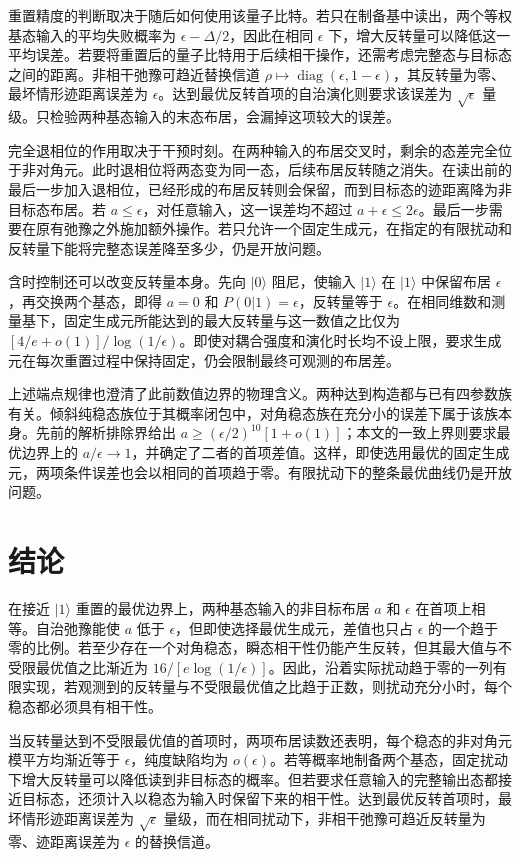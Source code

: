 \documentclass[aps,pra,reprint,amsmath,amssymb,nofootinbib,floatfix,longbibliography]{revtex4-2}
\theoremstyle{aps}
\DeclareMathOperator{\diag}{diag}
\newcommand{\eps}{\epsilon}
\newcommand{\ket}[1]{|#1\rangle}
\begin{document}
重置精度的判断取决于随后如何使用该量子比特。若只在制备基中读出，两个等权基态输入的平均失败概率为 $\eps-\Delta/2$，因此在相同 $\eps$ 下，增大反转量可以降低这一平均误差。若要将重置后的量子比特用于后续相干操作，还需考虑完整态与目标态之间的距离。非相干弛豫可趋近替换信道 $\rho\mapsto\diag(\eps,1-\eps)$，其反转量为零、最坏情形迹距离误差为 $\eps$。达到最优反转首项的自治演化则要求该误差为 $\sqrt\eps$ 量级。只检验两种基态输入的末态布居，会漏掉这项较大的误差。

完全退相位的作用取决于干预时刻。在两种输入的布居交叉时，剩余的态差完全位于非对角元。此时退相位将两态变为同一态，后续布居反转随之消失。在读出前的最后一步加入退相位，已经形成的布居反转则会保留，而到目标态的迹距离降为非目标态布居。若 $a\le\eps$，对任意输入，这一误差均不超过 $a+\eps\le2\eps$。最后一步需要在原有弛豫之外施加额外操作。若只允许一个固定生成元，在指定的有限扰动和反转量下能将完整态误差降至多少，仍是开放问题。

含时控制还可以改变反转量本身。先向 $\ket0$ 阻尼，使输入 $\ket1$ 在 $\ket1$ 中保留布居 $\eps$，再交换两个基态，即得 $a=0$ 和 $P(0|1)=\eps$，反转量等于 $\eps$。在相同维数和测量基下，固定生成元所能达到的最大反转量与这一数值之比仅为 $[4/e+o(1)]/\log(1/\eps)$。即使对耦合强度和演化时长均不设上限，要求生成元在每次重置过程中保持固定，仍会限制最终可观测的布居差。

上述端点规律也澄清了此前数值边界的物理含义。两种达到构造都与已有四参数族 \cite{Shahbeigi2024} 有关。倾斜纯稳态族位于其概率闭包中，对角稳态族在充分小的误差下属于该族本身。先前的解析排除界给出 $a\ge(\eps/2)^{10}[1+o(1)]$；本文的一致上界则要求最优边界上的 $a/\eps\to1$，并确定了二者的首项差值。这样，即使选用最优的固定生成元，两项条件误差也会以相同的首项趋于零。有限扰动下的整条最优曲线仍是开放问题。

\section{结论}\label{sec:conclusions}

在接近 $\ket1$ 重置的最优边界上，两种基态输入的非目标布居 $a$ 和 $\eps$ 在首项上相等。自治弛豫能使 $a$ 低于 $\eps$，但即使选择最优生成元，差值也只占 $\eps$ 的一个趋于零的比例。若至少存在一个对角稳态，瞬态相干性仍能产生反转，但其最大值与不受限最优值之比渐近为 $16/[e\log(1/\eps)]$。因此，沿着实际扰动趋于零的一列有限实现，若观测到的反转量与不受限最优值之比趋于正数，则扰动充分小时，每个稳态都必须具有相干性。

当反转量达到不受限最优值的首项时，两项布居读数还表明，每个稳态的非对角元模平方均渐近等于 $\eps$，纯度缺陷均为 $o(\eps)$。若等概率地制备两个基态，固定扰动下增大反转量可以降低读到非目标态的概率。但若要求任意输入的完整输出态都接近目标态，还须计入以稳态为输入时保留下来的相干性。达到最优反转首项时，最坏情形迹距离误差为 $\sqrt\eps$ 量级，而在相同扰动下，非相干弛豫可趋近反转量为零、迹距离误差为 $\eps$ 的替换信道。
\end{document}
